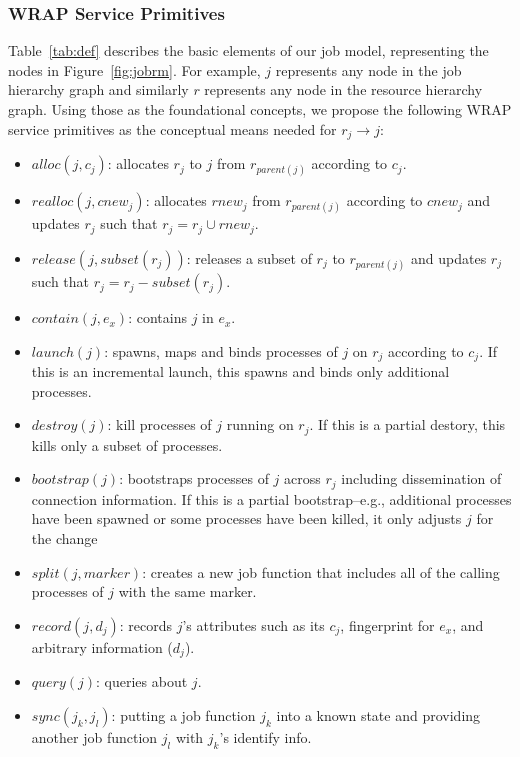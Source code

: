 \subsubsection{WRAP Service Primitives}
\label{sect:prim}

Table~\ref{tab:def} describes the basic elements of our job model, representing
the nodes in Figure~\ref{fig:jobrm}. For example, $j$ represents any node
in the job hierarchy graph and similarly $r$ represents any node in the resource hierarchy graph.
Using those as the foundational concepts, we propose
the following WRAP service primitives as the conceptual means
needed for $r_j \rightarrow j$:

\begin{itemize}

\item{$alloc(j, c_j)$: allocates $r_j$ to $j$ from $r_{parent(j)}$ according to $c_j$.}

\item{$realloc(j, cnew_j)$: allocates $rnew_j$ from $r_{parent(j)}$ according to $cnew_j$ and updates $r_j$ such that $r_j = r_j \cup rnew_j$.}

\item{$release(j, subset(r_j))$: releases a subset of $r_j$ to $r_{parent(j)}$ and updates $r_j$ such that $r_j = r_j - subset(r_j)$.}

\item{$contain(j, e_x)$: contains $j$ in $e_x$.}

\item{$launch(j)$: spawns, maps and binds processes of $j$ on $r_j$ according to $c_j$. If this is an incremental launch, this spawns and binds only additional processes.}

\item{$destroy(j)$: kill processes of $j$ running on $r_j$. If this is a partial destory, this kills only a subset of processes.}

\item{$bootstrap(j)$: bootstraps processes of $j$ across $r_j$ including dissemination of connection information. If this is a partial bootstrap--e.g., additional processes have been spawned or some processes have been killed, it only adjusts $j$ for the change}

\item{$split(j, marker)$: creates a new job function that includes all of the calling processes of $j$ with the same marker.}

\item{$record(j, d_j)$: records $j$'s attributes such as its $c_j$, fingerprint for $e_x$, and arbitrary information ($d_j$).}

\item{$query(j)$: queries about $j$.}

\item{$sync(j_k, j_l)$: putting a job function $j_k$ into a known state and providing another job function $j_l$ with $j_k$'s identify info.}

\end{itemize}

